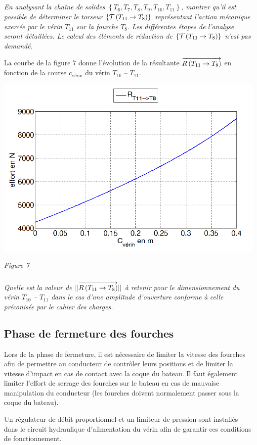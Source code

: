 \documentclass[10pt,fleqn]{article} %
\begin{document}
\subparagraph{}
\textit{En analysant la chaîne de solides $\left\{T_6, T_7, T_8, T_9, T_{10}, T_{11} \right\}$, montrer qu’il est possible de déterminer le torseur $\left\{\mathcal{T} \left(T_{11}\rightarrow T_{8} \right) \right\}$ représentant l’action mécanique exercée par le vérin $T_{11}$ sur la fourche $T_{8}$. Les différentes étapes de l’analyse seront détaillées. Le calcul des éléments de réduction de $\left\{\mathcal{T} \left(T_{11}\rightarrow T_{8} \right) \right\}$ n’est pas demandé.}



La courbe de la figure 7 donne l’évolution de la résultante $\overrightarrow{R\left( {T_{11}} \rightarrow {T_{8}}\right)}$ en fonction de la course $c_{\text{v\'erin}}$ du vérin $T_{10}$ -- $T_{11}$.

\begin{center}
\includegraphics[width=.65\linewidth]{images/fig_07}

\textit{Figure 7}
\end{center}

\subparagraph{}
\textit{Quelle est la valeur de $||\overrightarrow{R\left( {T_{11}} \rightarrow {T_{8}}\right)}||$ à retenir pour le dimensionnement du vérin $T_{10}$ -- $T_{11}$ dans le cas d’une amplitude d’ouverture conforme à celle préconisée par le cahier des charges.}

\subsection{Phase de fermeture des fourches}
Lors de la phase de fermeture, il est nécessaire de limiter la vitesse des fourches afin de permettre au conducteur de contrôler leurs positions et de limiter la vitesse d’impact en cas de contact avec la coque du bateau. Il faut également limiter l’effort de serrage des fourches sur le bateau en cas de mauvaise manipulation du conducteur (les fourches doivent normalement passer sous la coque du bateau).

Un régulateur de débit proportionnel et un limiteur de pression sont installés dans le circuit hydraulique d’alimentation du vérin afin de garantir ces conditions de fonctionnement.
\end{document}
